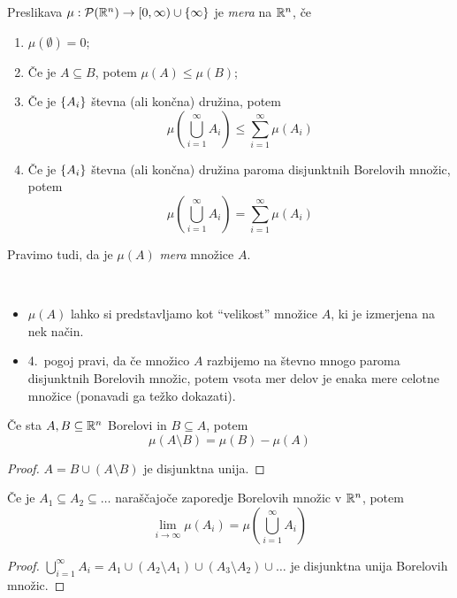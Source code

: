 \begin{definicija}
    Preslikava \(\mu: \mathcal{P}(\mathbb{R}^n) \to [0, \infty) \cup \left\{\infty\right\}\) je \emph{mera} na \(\mathbb{R}^n\), če 
    \begin{enumerate}
        \item \(\mu(\emptyset) = 0\);
        \item Če je \(A \subseteq B\), potem \(\mu(A) \leq \mu(B)\);
        \item Če je \(\left\{A_i\right\}\) števna (ali končna) družina, potem 
        \[\mu\left(\bigcup_{i=1}^\infty A_i\right) \leq \sum_{i=1}^{\infty} \mu (A_i)\]
        \item Če je \(\left\{A_i\right\}\) števna (ali končna) družina paroma disjunktnih Borelovih množic, potem 
        \[\mu\left(\bigcup_{i=1}^\infty A_i\right) = \sum_{i=1}^{\infty} \mu (A_i)\]
    \end{enumerate}
    Pravimo tudi, da je \(\mu(A)\) \emph{mera} množice \(A\).
\end{definicija}
\begin{opomba} \
    \begin{itemize}
        \item \(\mu(A)\) lahko si predstavljamo kot "`velikost"' množice \(A\), ki je izmerjena na nek način.
        \item 4.\ pogoj pravi, da če množico \(A\) razbijemo na števno mnogo paroma disjunktnih Borelovih množic, potem vsota mer delov je enaka mere celotne množice (ponavadi ga težko dokazati).
    \end{itemize}
\end{opomba}

\begin{lema}
    Če sta \(A, B \subseteq \mathbb{R}^n\) Borelovi in \(B \subseteq A\), potem
    \[\mu(A \setminus B) = \mu(B) - \mu(A)\]
\end{lema}

\begin{proof}
    \(A = B \cup (A \setminus B)\) je disjunktna unija.
\end{proof}

\begin{lema}
    Če je \(A_1 \subseteq A_2 \subseteq \ldots \) naraščajoče zaporedje Borelovih množic v \(\mathbb{R}^n\), potem 
    \[\lim_{i \to \infty} \mu(A_i) = \mu\left(\bigcup_{i=1}^\infty A_i\right)\]
\end{lema}

\begin{proof}
    \(\bigcup_{i=1}^\infty A_i = A_1 \cup (A_2 \setminus A_1) \cup (A_3 \setminus A_2) \cup \ldots\) je disjunktna unija Borelovih množic.
\end{proof}

